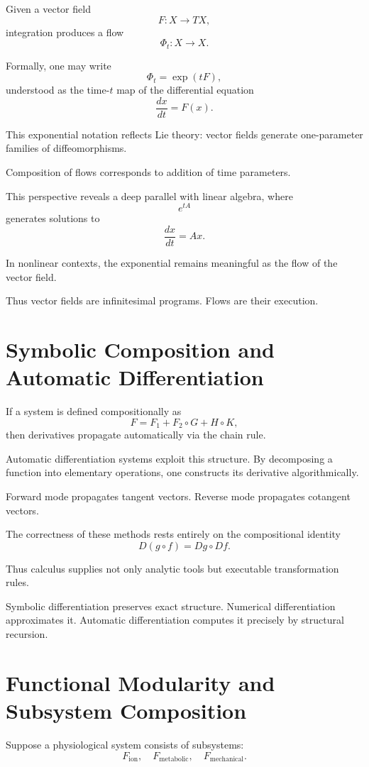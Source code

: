 \documentclass[12pt]{book}
\begin{document}
Given a vector field
\[
F : X \to TX,
\]
integration produces a flow
\[
\Phi_t : X \to X.
\]

Formally, one may write
\[
\Phi_t = \exp(tF),
\]
understood as the time-$t$ map of the differential equation
\[
\frac{dx}{dt} = F(x).
\]

This exponential notation reflects Lie theory: vector fields generate one-parameter families of diffeomorphisms.

Composition of flows corresponds to addition of time parameters.

This perspective reveals a deep parallel with linear algebra, where
\[
e^{tA}
\]
generates solutions to
\[
\frac{dx}{dt} = Ax.
\]

In nonlinear contexts, the exponential remains meaningful as the flow of the vector field.

Thus vector fields are infinitesimal programs. Flows are their execution.

\section{Symbolic Composition and Automatic Differentiation}

If a system is defined compositionally as
\[
F = F_1 + F_2 \circ G + H \circ K,
\]
then derivatives propagate automatically via the chain rule.

Automatic differentiation systems exploit this structure. By decomposing a function into elementary operations, one constructs its derivative algorithmically.

Forward mode propagates tangent vectors. Reverse mode propagates cotangent vectors.

The correctness of these methods rests entirely on the compositional identity
\[
D(g \circ f) = Dg \circ Df.
\]

Thus calculus supplies not only analytic tools but executable transformation rules.

Symbolic differentiation preserves exact structure. Numerical differentiation approximates it. Automatic differentiation computes it precisely by structural recursion.

\section{Functional Modularity and Subsystem Composition}

Suppose a physiological system consists of subsystems:
\[
F_{\text{ion}},
\quad
F_{\text{metabolic}},
\quad
F_{\text{mechanical}}.
\]
\end{document}

